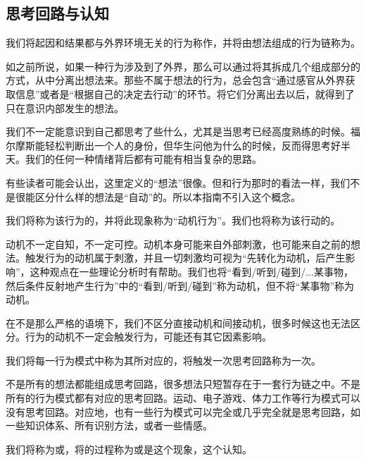 \subsection{思考回路与认知}
我们将起因和结果都与外界环境无关的行为称作，并将由想法组成的行为链称为。
\begin{explain}
如之前所说，如果一种行为涉及到了外界，那么可以通过将其拆成几个组成部分的方式，从中分离出想法来。那些不属于想法的行为，总会包含“通过感官从外界获取信息”或者是“根据自己的决定去行动”的环节。将它们分离出去以后，就得到了只在意识内部发生的想法。

我们不一定能意识到自己都思考了些什么，尤其是当思考已经高度熟练的时候。福尔摩斯能轻松判断出一个人的身份，但华生问他为什么的时候，反而得思考好半天。我们的任何一种情绪背后都有可能有相当复杂的思路。

有些读者可能会认出，这里定义的“想法”很像。但和行为那时的看法一样，我们不是很能区分什么样的想法是“自动”的。所以本指南不引入这个概念。
\end{explain}
我们将称为该行为的，并将此现象称为“动机行为”。我们也将称为该行动的。
\begin{explain}
动机不一定自知，不一定可控。动机本身可能来自外部刺激，也可能来自之前的想法。触发行为的动机属于刺激，并且一切刺激均可视为“先转化为动机，后产生影响”，这种观点在一些理论分析时有帮助。我们也将“看到/听到/碰到/...某事物，然后条件反射地产生行为”中的“看到/听到/碰到”称为动机，但不将“某事物”称为动机。

在不是那么严格的语境下，我们不区分直接动机和间接动机，很多时候这也无法区分。行为的动机不一定会触发行为，可能还有其它因素影响。
\end{explain}
我们将每一行为模式中称为其所对应的，将触发一次思考回路称为一次。
\begin{explain}
不是所有的想法都能组成思考回路，很多想法只短暂存在于一套行为链之中。不是所有的行为模式都有对应的思考回路。运动、电子游戏、体力工作等行为模式可以没有思考回路。对应地，也有一些行为模式可以完全或几乎完全就是思考回路，如一些知识体系、所有识别方法，或者一些情感。
\end{explain}
我们将称为或，将的过程称为或是这个现象，这个认知。
